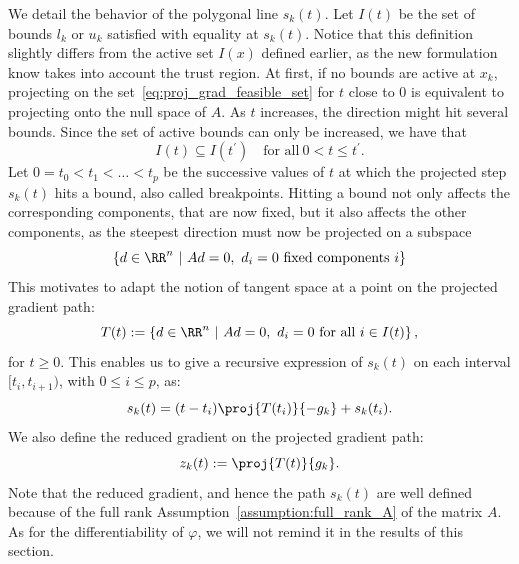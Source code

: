We detail the behavior of the polygonal line $s_k(t)$. Let $I(t)$ be the set of bounds $l_k$ or $u_k$ satisfied with equality at $s_k(t)$. Notice that this definition slightly differs from the active set $I(x)$ defined earlier, as the new formulation know takes into account the trust region. At first, if no bounds are active at $x_k$, projecting on the set~\eqref{eq:proj_grad_feasible_set} for $t$ close to $0$ is equivalent to projecting onto the null space of $A$. As $t$ increases, the direction might hit several bounds. Since the set of active bounds can only be increased, we have that
\begin{equation}\label{eq:nested_active_sets}
	I(t) \subseteq I(t^\prime) \quad \text{for all}\ 0 < t \le t^\prime.
\end{equation}
Let \(0=t_0 < t_1 < \ldots < t_p\) be the successive values of $t$ at which the projected step $s_k(t)$ hits a bound, also called breakpoints. Hitting a bound not only affects the corresponding components, that are now fixed, but it also affects the other components, as the steepest direction must now be projected on a subspace
\[\left\{d \in \RR^n \ | \ Ad=0,\ d_i=0\ \text{fixed components}\ i\right\}\]
This motivates to adapt the notion of tangent space at a point on the projected gradient path:
\begin{equation*}
	T(t) := \left\{ d \in \RR^n \ | \ Ad = 0,\ d_i=0\ \text{for all}\ i\in I(t)\right\},
\end{equation*}
for $t\ge0$. This enables us to give a recursive expression of $s_k(t)$ on each interval $[t_i,t_{i+1})$, with $0 \leq i \le p$, as:
\begin{equation}\label{eq:projected_gradient_path_recursion}
	s_k(t) = (t-t_i) \proj{T(t_i)}{-g_k} + s_k(t_i).
\end{equation}
We also define the reduced gradient on the projected gradient path:
\begin{equation}\label{eq:reduced_gradient_proj_grad_path}
	z_k(t) := \proj{T(t)}{g_k}.
\end{equation}
Note that the reduced gradient, and hence the path $s_k(t)$ are well defined because of the full rank Assumption~\ref{assumption:full_rank_A} of the matrix $A$. As for the differentiability of $\varphi$, we will not remind it in the results of this section.

